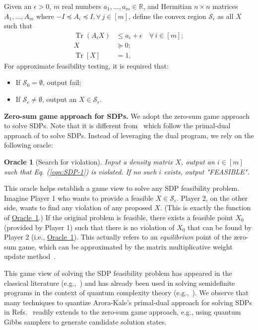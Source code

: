 \documentclass[a4paper,UKenglish,cleveref, autoref]{lipics-v2019}
\newtheorem{oracle}{Oracle}
\theoremstyle{remark}
\numberwithin{equation}{section}
\numberwithin{oracle}{section}
\numberwithin{remark}{section}
\newcommand{\eqn}[1]{(\ref{eqn:#1})}
\newcommand{\ora}[1]{\hyperref[ora:#1]{Oracle~\ref*{ora:#1}}}
\newcommand{\range}[1]{[#1]}
\newcommand{\R}{\ensuremath{\mathbb{R}}}
\DeclareMathOperator{\tr}{Tr}
\DeclareMathOperator{\Tr}{Tr}
\newcommand{\hd}[1]{\vspace{2mm} \noindent \textbf{#1}}
\begin{document}
\begin{definition}[Feasibility] \label{defn:feasibility}
Given an $\epsilon>0$, $m$ real numbers $a_{1},\ldots,a_{m}\in\R$, and Hermitian $n\times n$ matrices $A_{1},\ldots,A_{m}$ where $-I\preceq A_{i}\preceq I, \forall\,j\in\range{m}$, define the convex region $\mathcal{S}_{\epsilon}$ as all $X$ such that
\begin{align}
\tr(A_{i} X) &\leq a_{i}+\epsilon\quad\forall\,i\in\range{m}; \label{eqn:SDP-1} \\
X&\succeq 0; \label{eqn:SDP-2} \\
\Tr[X]&=1. \label{eqn:SDP-3}
\end{align}
For approximate feasibility testing, it is required that:
\begin{itemize}
\item If $\mathcal{S}_{0}=\emptyset$, output fail;
\item If $\mathcal{S}_{\epsilon}\neq\emptyset$, output an $X\in\mathcal{S}_{\epsilon}$.
\end{itemize}
\end{definition}

\hd{Zero-sum game approach for SDPs.} We adopt the zero-sum game approach to solve SDPs. Note that it is different from~\cite{brandao2016quantum, vanApeldoorn2017quantum} which follow the primal-dual approach of \cite{arora2007combinatorial} to solve SDPs. Instead of leveraging the dual program, we rely on the following oracle:
\begin{oracle}[Search for violation] \label{ora:violation}
Input a density matrix $X$, output an $i\in\range{m}$ such that Eq. \eqn{SDP-1} is violated. If no such $i$ exists, output "FEASIBLE".
\end{oracle}
This oracle helps establish a game view to solve any SDP feasibility problem. Imagine Player 1 who wants to provide a feasible $X \in \mathcal{S}_{\epsilon}$. Player 2, on the other side, wants to find any violation of any proposed $X$. (This is exactly the function of \ora{violation}.)
If the original problem is feasible, there exists a feasible point $X_0$ (provided by Player 1) such that there is no violation of $X_0$ that can be found by Player 2 (i.e., \ora{violation}). This actually refers to an \emph{equilibrium} point of the zero-sum game, which can be approximated by the matrix multiplicative weight update method~\cite{v008a006}.

This game view of solving the SDP feasibility problem has appeared in the classical literature (e.g.,~\cite{Hazan}) and has already been used in solving semidefinite programs in the context of quantum complexity theory (e.g.,~\cite{Wu10, gutoski2012parallel}). We observe that many techniques to quantize Arora-Kale's primal-dual approach \cite{arora2007combinatorial} for solving SDPs in Refs.~\cite{brandao2016quantum, vanApeldoorn2017quantum} readily extends to the zero-sum game approach, e.g., using quantum Gibbs samplers to generate candidate solution states.
\end{document}
